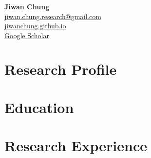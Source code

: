 \documentclass[11pt]{article} %
\newcommand{\mytitle}[5]{
  \begin{center}
    \Large\textbf{#1}\normalsize \\ %
    \href{mailto:#2}{#2} \\ %
    \href{https://#3}{#3} \\ %
    #4 \\ %
    #5 %
  \end{center}
}
\begin{document}
\mytitle{Jiwan Chung}{jiwan.chung.research@gmail.com}{jiwanchung.github.io}{\href{https://scholar.google.co.kr/citations?user=l4UBOZAAAAAJ}{Google Scholar}}{}


\RaggedRight

\section*{Research Profile}


\section*{Education}
\vspace{-1.2em}


\vspace{-1.0em}
\section*{Research Experience}
\label{exp_research}
\vspace{-1.5em}


\vspace{-1.0em}
\end{document}
